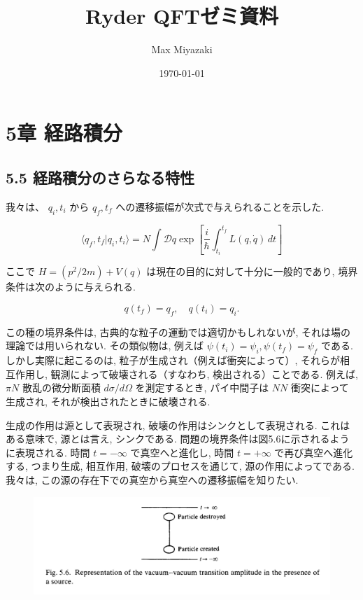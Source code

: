 \documentclass[a4paper,12pt]{article}
\title{Ryder QFTゼミ資料}
\date{\today}
\author{Max Miyazaki}
\begin{document}
\maketitle
\section*{\textrm{5章 経路積分}}
\subsection*{\textrm{5.5 経路積分のさらなる特性}}

我々は、 \( q_i, t_i \) から \( q_f, t_f \) への遷移振幅が次式で与えられることを示した.

\begin{equation*}
\langle q_f, t_f | q_i, t_i \rangle = N \int \mathcal{D}q \exp \left[ \frac{i}{\hbar} \int_{t_i}^{t_f} L(q, \dot{q}) \, dt \right]
\end{equation*}

ここで \( H = \left( p^2/2m \right) + V(q) \) は現在の目的に対して十分に一般的であり, 境界条件は次のように与えられる.

\begin{equation*}
q(t_f) = q_f, \quad q(t_i) = q_i.
\end{equation*}

この種の境界条件は, 古典的な粒子の運動では適切かもしれないが, それは場の理論では用いられない. その類似物は, 例えば \( \psi(t_i) = \psi_i, \psi(t_f) = \psi_f \) である. しかし実際に起こるのは, 粒子が生成され（例えば衝突によって）, それらが相互作用し, 観測によって破壊される（すなわち, 検出される）ことである. 例えば, \( \pi N \) 散乱の微分断面積 \( d\sigma/d\Omega \) を測定するとき, パイ中間子は \( NN \) 衝突によって生成され, それが検出されたときに破壊される.

生成の作用は源として表現され, 破壊の作用はシンクとして表現される. これはある意味で, 源とは言え, シンクである. 問題の境界条件は図5.6に示されるように表現される. 時間 \( t = -\infty \) で真空へと進化し, 時間 \( t = +\infty \) で再び真空へ進化する, つまり生成, 相互作用, 破壊のプロセスを通じて, 源の作用によってである. 我々は, この源の存在下での真空から真空への遷移振幅を知りたい.

\begin{figure}[H]
    \centering
    \includegraphics[width=\textwidth]{figure/fig5-6.png}    
\end{figure}
\end{document}
